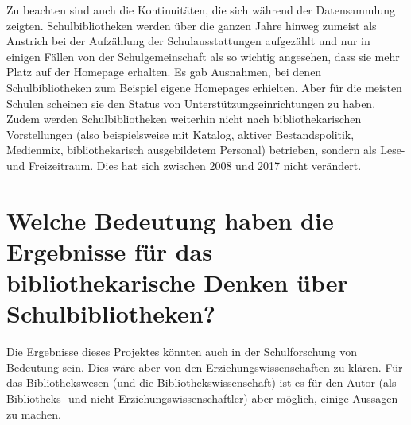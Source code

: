 \documentclass[a4paper,
fontsize=11pt,
oneside,
numbers=noperiodatend,
parskip=half-,
bibliography=totoc,
final
]{scrartcl}
\begin{document}
Zu beachten sind auch die Kontinuitäten, die sich während der
Datensammlung zeigten. Schulbibliotheken werden über die ganzen Jahre
hinweg zumeist als Anstrich bei der Aufzählung der Schulausstattungen
aufgezählt und nur in einigen Fällen von der Schulgemeinschaft als so
wichtig angesehen, dass sie mehr Platz auf der Homepage erhalten. Es gab
Ausnahmen, bei denen Schulbibliotheken zum Beispiel eigene Homepages
erhielten. Aber für die meisten Schulen scheinen sie den Status von
Unterstützungseinrichtungen zu haben. Zudem werden Schulbibliotheken
weiterhin nicht nach bibliothekarischen Vorstellungen (also
beispielsweise mit Katalog, aktiver Bestandspolitik, Medienmix,
bibliothekarisch ausgebildetem Personal) betrieben, sondern als Lese-
und Freizeitraum. Dies hat sich zwischen 2008 und 2017 nicht verändert.

\section{Welche Bedeutung haben die Ergebnisse für das
bibliothekarische Denken über
Schulbibliotheken?}\label{welche-bedeutung-haben-die-ergebnisse-fuxfcr-das-bibliothekarische-denken-uxfcber-schulbibliotheken}

Die Ergebnisse dieses Projektes könnten auch in der Schulforschung von
Bedeutung sein. Dies wäre aber von den Erziehungswissenschaften zu
klären. Für das Bibliothekswesen (und die Bibliothekswissenschaft) ist
es für den Autor (als Bibliotheks- und nicht Erziehungswissenschaftler)
aber möglich, einige Aussagen zu machen.
\end{document}
